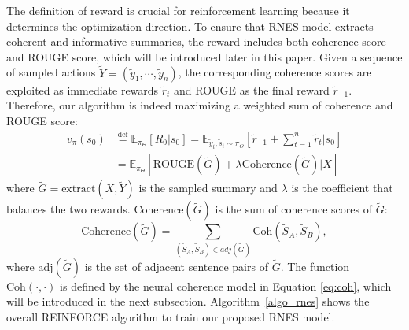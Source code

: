 \documentclass[letterpaper]{article} %
\begin{document}
	The definition of reward is crucial for reinforcement learning because it determines the optimization direction. To ensure that RNES model extracts coherent and informative summaries, the reward includes both coherence score and ROUGE score, which will be introduced later in this paper. Given a sequence of sampled actions $\tilde{Y} = (\tilde{y}_1, \cdots, \tilde{y}_n)$, the corresponding coherence scores are exploited as immediate rewards $\tilde{r}_t$ and ROUGE as the final reward $\tilde{r}_{-1}$. Therefore, our algorithm is indeed maximizing a weighted sum of coherence and ROUGE score:
	\begin{align}
	v_{\pi}(s_0) &\overset{\text{def}}{=} \mathbb{E}_{\pi_{\Theta}}[R_0 |s_0] = \mathbb{E}_{\tilde{y}_t, \tilde{s}_t \sim \pi_{\Theta}} [ \tilde{r}_{-1} + \sum_{t=1}^{n} \tilde{r}_t | s_0] \nonumber \\
	&= \mathbb{E}_{\pi_{\Theta}} [ \text{ROUGE}(\tilde{G}) + \lambda \text{Coherence}(\tilde{G}) | X ] \label{eq:reward_sum} 
	\end{align}
	where $\tilde{G} =\text{extract} (X, \tilde{Y})$ is the sampled summary and $\lambda$ is the coefficient that balances the two rewards. $\text{Coherence}(\tilde{G})$ is the sum of coherence scores of $\tilde{G}$:
	\[\text{Coherence}(\tilde{G})= \sum_{(\tilde{S}_A, \tilde{S}_B) \in adj(\tilde{G})} \text{Coh}(\tilde{S}_A, \tilde{S}_B) ,\]
 	where $\text{adj}(\tilde{G})$ is the set of adjacent sentence pairs of $\tilde{G}$. The function $\text{Coh}(\cdot,\cdot)$ is defined by the neural coherence model in Equation \ref{eq:coh}, which will be introduced in the next subsection. Algorithm~\ref{algo_rnes} shows the overall REINFORCE algorithm to train our proposed RNES model.  
	
\end{document}
